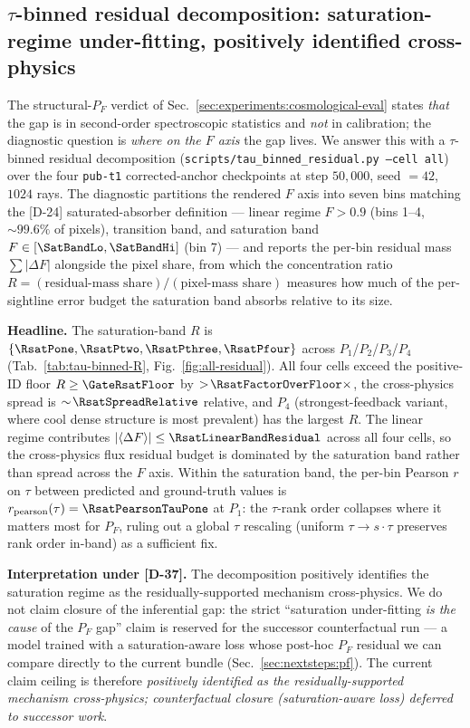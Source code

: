 \subsection{$\tau$-binned residual decomposition: saturation-regime under-fitting, positively identified cross-physics}
\label{sec:experiments:tau-binned}
The structural-$P_F$ verdict of Sec.~\ref{sec:experiments:cosmological-eval} states \emph{that} the gap is in second-order spectroscopic statistics and \emph{not} in calibration; the diagnostic question is \emph{where on the $F$ axis} the gap lives. We answer this with a $\tau$-binned residual decomposition (\texttt{scripts/tau\_binned\_residual.py --cell all}) over the four \texttt{pub-t1} corrected-anchor checkpoints at step $50{,}000$, seed $=42$, $1024$ rays. The diagnostic partitions the rendered $F$ axis into seven bins matching the [D-24] saturated-absorber definition --- linear regime $F > 0.9$ (bins 1--4, $\sim\!99.6\%$ of pixels), transition band, and saturation band $F \in [\SatBandLo, \SatBandHi]$ (bin 7) --- and reports the per-bin residual mass $\sum |\Delta F|$ alongside the pixel share, from which the concentration ratio $R = (\text{residual-mass share}) / (\text{pixel-mass share})$ measures how much of the per-sightline error budget the saturation band absorbs relative to its size.

\textbf{Headline.} The saturation-band $R$ is $\{\RsatPone, \RsatPtwo, \RsatPthree, \RsatPfour\}$ across $P_1$/$P_2$/$P_3$/$P_4$ (Tab.~\ref{tab:tau-binned-R}, Fig.~\ref{fig:all-residual}). All four cells exceed the positive-ID floor $R \geq \GateRsatFloor$ by $> \!\RsatFactorOverFloor\times$, the cross-physics spread is $\sim\!\RsatSpreadRelative$ relative, and $P_4$ (strongest-feedback variant, where cool dense structure is most prevalent) has the largest $R$. The linear regime contributes $|\langle \Delta F\rangle| \leq \RsatLinearBandResidual$ across all four cells, so the cross-physics flux residual budget is dominated by the saturation band rather than spread across the $F$ axis. Within the saturation band, the per-bin Pearson $r$ on $\tau$ between predicted and ground-truth values is $r_{\text{pearson}}(\tau) = \RsatPearsonTauPone$ at $P_1$: the $\tau$-rank order collapses where it matters most for $P_F$, ruling out a global $\tau$ rescaling (uniform $\tau \to s \cdot \tau$ preserves rank order in-band) as a sufficient fix.

\textbf{Interpretation under [D-37].} The decomposition positively identifies the saturation regime as the residually-supported mechanism cross-physics. We do not claim closure of the inferential gap: the strict ``saturation under-fitting \emph{is the cause} of the $P_F$ gap'' claim is reserved for the successor counterfactual run --- a model trained with a saturation-aware loss whose post-hoc $P_F$ residual we can compare directly to the current bundle (Sec.~\ref{sec:nextsteps:pf}). The current claim ceiling is therefore \emph{positively identified as the residually-supported mechanism cross-physics; counterfactual closure (saturation-aware loss) deferred to successor work}.

